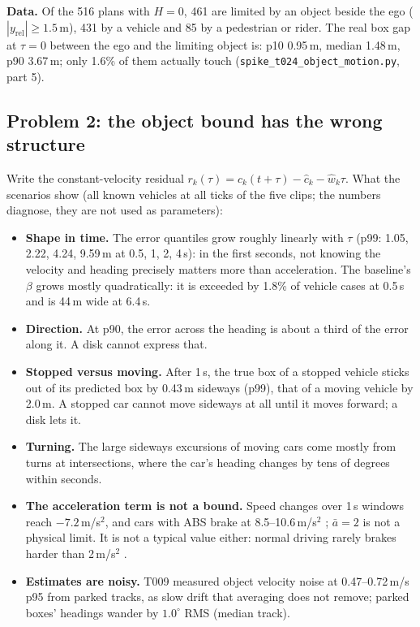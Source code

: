 \documentclass[11pt]{article}
\theoremstyle{definition}
\theoremstyle{remark}
\begin{document}
\textbf{Data.} Of the 516 plans with $H=0$, 461 are limited by an object beside the ego
($|y_{\mathrm{rel}}|\ge1.5$\,m), 431 by a vehicle and 85 by a pedestrian or rider. The real box gap at
$\tau=0$ between the ego and the limiting object is: p10 0.95\,m, median 1.48\,m, p90 3.67\,m; only 1.6\%
of them actually touch (\texttt{spike\_t024\_object\_motion.py}, part 5).

\subsection{Problem 2: the object bound has the wrong structure}
Write the constant-velocity residual $r_k(\tau)=c_k(t+\tau)-\hat c_k-\hat w_k\tau$. What the scenarios
show (all known vehicles at all ticks of the five clips; the numbers diagnose, they are not used as
parameters):
\begin{itemize}[leftmargin=*]
  \item \textbf{Shape in time.} The error quantiles grow roughly linearly with $\tau$ (p99: 1.05, 2.22,
    4.24, 9.59\,m at 0.5, 1, 2, 4\,s): in the first seconds, not knowing the velocity and heading precisely
    matters more than acceleration. The baseline's $\beta$ grows mostly quadratically: it is exceeded by
    1.8\% of vehicle cases at 0.5\,s and is 44\,m wide at 6.4\,s.
  \item \textbf{Direction.} At p90, the error across the heading is about a third of the error along it.
    A disk cannot express that.
  \item \textbf{Stopped versus moving.} After 1\,s, the true box of a stopped vehicle sticks out of its
    predicted box by 0.43\,m sideways (p99), that of a moving vehicle by 2.0\,m. A stopped car cannot
    move sideways at all until it moves forward; a disk lets it.
  \item \textbf{Turning.} The large sideways excursions of moving cars come mostly from turns at
    intersections, where the car's heading changes by tens of degrees within seconds.
  \item \textbf{The acceleration term is not a bound.} Speed changes over 1\,s windows reach $-7.2$\,m/s$^2$,
    and cars with ABS brake at 8.5--10.6\,m/s$^2$ \cite{miller2023}; $\bar a=2$ is not a physical limit.
    It is not a typical value either: normal driving rarely brakes harder than 2\,m/s$^2$ \cite{bosetti2014}.
  \item \textbf{Estimates are noisy.} T009 measured object velocity noise at 0.47--0.72\,m/s p95 from
    parked tracks, as slow drift that averaging does not remove; parked boxes' headings wander by
    $1.0^\circ$ RMS (median track).
\end{itemize}
\end{document}
